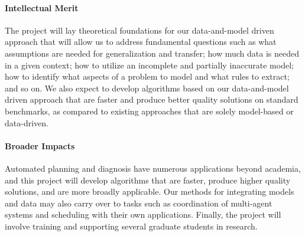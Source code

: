 \documentclass[12pt]{article}
\begin{document}
\paragraph{Intellectual Merit} The project will lay theoretical foundations for our data-and-model driven approach that will allow us to address fundamental questions such as what assumptions are needed for generalization and transfer; how much data is needed in a given context; how to utilize an incomplete and partially inaccurate model; how to identify what aspects of a problem to model and what rules to extract; and so on. We also expect to develop algorithms based on our data-and-model driven approach that are faster and produce better quality solutions on standard benchmarks, as compared to existing approaches that are solely model-based or data-driven.

\paragraph{Broader Impacts} Automated planning and diagnosis have numerous applications beyond academia, and this project will develop algorithms that are faster, produce higher quality solutions, and are more broadly applicable. Our methods for integrating models and data may also carry over to tasks such as coordination of multi-agent systems and scheduling with their own applications. Finally, the project will involve training and supporting several graduate students in research.
\end{document}
